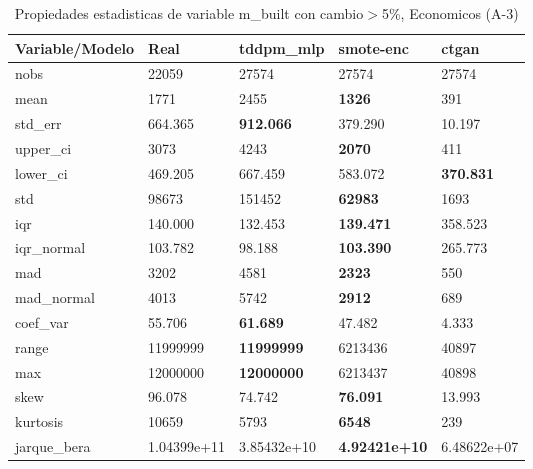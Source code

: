 \begin{table}[H]
\centering
\fontsize{8}{14}\selectfont
\caption{Propiedades estadisticas de variable m\_built con cambio\ensuremath{>}5\%, Economicos (A-3)}
\label{table-stats-economicos-a-3-m_built-short}
\begin{tabular}{|l|m{10em}|m{10em}|m{10em}|m{10em}|}
\hline
 \rowcolor[gray]{0.8}
Variable/Modelo & Real & tddpm\_mlp & smote-enc & ctgan \\
\hline nobs & 22059 & 27574 & 27574 & 27574 \\
\hline mean & 1771 & 2455 & \bfseries 1326 & \cellcolor[rgb]{0.9, 0.54, 0.52} 391 \\
\hline std\_err & 664.365 & \bfseries 912.066 & 379.290 & \cellcolor[rgb]{0.9, 0.54, 0.52} 10.197 \\
\hline upper\_ci & 3073 & 4243 & \bfseries 2070 & \cellcolor[rgb]{0.9, 0.54, 0.52} 411 \\
\hline lower\_ci & 469.205 & \cellcolor[rgb]{0.9, 0.54, 0.52} 667.459 & 583.072 & \bfseries 370.831 \\
\hline std & 98673 & 151452 & \bfseries 62983 & \cellcolor[rgb]{0.9, 0.54, 0.52} 1693 \\
\hline iqr & 140.000 & 132.453 & \bfseries 139.471 & \cellcolor[rgb]{0.9, 0.54, 0.52} 358.523 \\
\hline iqr\_normal & 103.782 & 98.188 & \bfseries 103.390 & \cellcolor[rgb]{0.9, 0.54, 0.52} 265.773 \\
\hline mad & 3202 & 4581 & \bfseries 2323 & \cellcolor[rgb]{0.9, 0.54, 0.52} 550 \\
\hline mad\_normal & 4013 & 5742 & \bfseries 2912 & \cellcolor[rgb]{0.9, 0.54, 0.52} 689 \\
\hline coef\_var & 55.706 & \bfseries 61.689 & 47.482 & \cellcolor[rgb]{0.9, 0.54, 0.52} 4.333 \\
\hline range & 11999999 & \bfseries 11999999 & 6213436 & \cellcolor[rgb]{0.9, 0.54, 0.52} 40897 \\
\hline max & 12000000 & \bfseries 12000000 & 6213437 & \cellcolor[rgb]{0.9, 0.54, 0.52} 40898 \\
\hline skew & 96.078 & 74.742 & \bfseries 76.091 & \cellcolor[rgb]{0.9, 0.54, 0.52} 13.993 \\
\hline kurtosis & 10659 & 5793 & \bfseries 6548 & \cellcolor[rgb]{0.9, 0.54, 0.52} 239 \\
\hline jarque\_bera & 1.04399e+11 & 3.85432e+10 & \bfseries 4.92421e+10 & \cellcolor[rgb]{0.9, 0.54, 0.52} 6.48622e+07 \\

\end{tabular}
\end{table}
